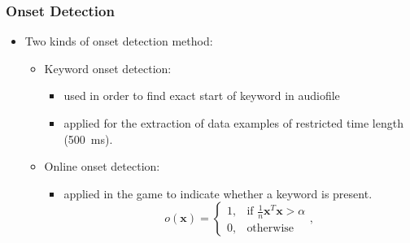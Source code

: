 \begin{frame}
  \frametitle{Onset Detection}
  \vspace{-0.75cm}
  \begin{itemize}
    \item Two kinds of onset detection method:
    \begin{itemize}
      \item Keyword onset detection:
        \begin{itemize}
          \item used in order to find exact start of keyword in audiofile
          \item applied for the extraction of data examples of restricted time length (\SI{500}{\milli\second}).
        \end{itemize}
      \item Online onset detection:
        \begin{itemize}
          \item applied in the game to indicate whether a keyword is present.
          \begin{equation*}
            o(\bm{x}) = 
            \begin{cases}
              1, & \text{if } \frac{1}{n} \bm{x}^T \bm{x} > \alpha\\
              0, & \text{otherwise} 
            \end{cases},
          \end{equation*}
        \end{itemize}
    \end{itemize}
  \end{itemize}
\end{frame}

